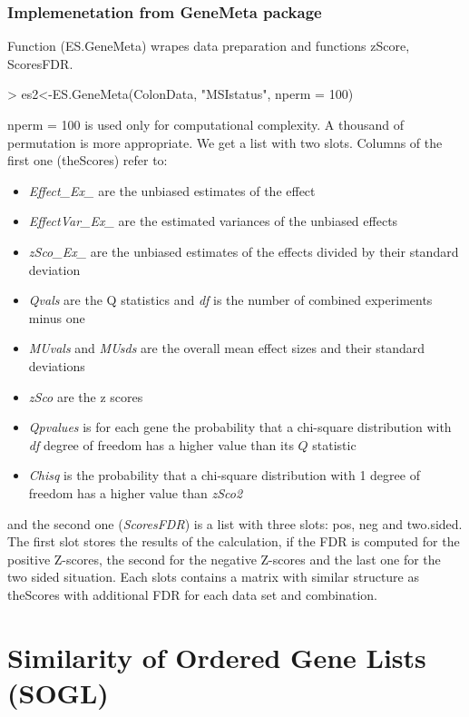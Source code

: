 \documentclass[a4paper]{report}
\begin{document}
\subsection*{Implemenetation from GeneMeta package}
Function ({\ttfamily ES.GeneMeta}) wrapes data preparation and functions {\ttfamily zScore}, {\ttfamily ScoresFDR}.
\begin{Schunk}
\begin{Sinput}
> es2<-ES.GeneMeta(ColonData, "MSIstatus", nperm = 100)
\end{Sinput}
\end{Schunk}
{\ttfamily nperm = 100} is used only for computational complexity. A thousand of permutation is more appropriate.  
We get a list with two slots. Columns of the first one ({\ttfamily theScores}) refer to:
\begin{itemize}
\item \emph{Effect\_Ex\_ } are the unbiased estimates of the effect 
\item \emph{EffectVar\_Ex\_ } are the estimated variances of the unbiased effects 
\item \emph{zSco\_Ex\_} are the unbiased estimates of the effects divided by their standard deviation 
\item \emph{Qvals} are the Q statistics and \emph{df} is the number of combined experiments minus one
\item \emph{MUvals} and \emph{MUsds} are the overall mean effect sizes and their standard deviations 
\item \emph{zSco} are the z scores  
\item \emph{Qpvalues} is for each gene the probability that a chi-square distribution with \emph{df} degree of freedom has a higher value than its $Q$ statistic
\item \emph{Chisq} is the probability that a chi-square distribution with 1 degree of freedom has a higher value than \emph{zSco2}
\end{itemize}

and the second one (\emph{ScoresFDR}) is a list with three slots: {\ttfamily pos}, {\ttfamily neg} and {\ttfamily two.sided}. The first slot stores the results of the calculation, if the FDR is computed for the positive Z-scores, the second for the negative Z-scores and the last one for the two sided situation. Each slots contains a matrix with similar structure as {\ttfamily theScores} with additional FDR for each data set and combination.\par  


\chapter{Similarity of Ordered Gene Lists (SOGL)}
\end{document}

